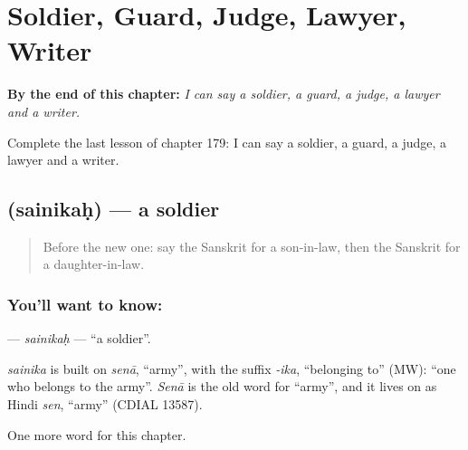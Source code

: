 
\chapter{Soldier, Guard, Judge, Lawyer, Writer}
\label{ch:sa-soldier-guard-judge-lawyer-writer}

\begin{chapteropening}
\textbf{By the end of this chapter:} \emph{I can say a soldier, a guard, a judge, a lawyer and a writer.}

Complete the last lesson of chapter 179: I can say a soldier, a guard, a judge, a lawyer and a writer.
\end{chapteropening}

\section[\texorpdfstring{\sk{सैनिकः} (sainikaḥ)}{सैनिकः (sainikaḥ)}]{ (sainikaḥ) — a soldier}

\label{lesson:SA-C179-sainikah}



\begin{quote}
Before the new one: say the Sanskrit for a son-in-law, then the Sanskrit for a daughter-in-law.
\end{quote}

\subsection*{You'll want to know: }
\textbf{} — \emph{sainikaḥ} — \textquotedblleft{}a soldier\textquotedblright{}.

\begin{cousinweb}
\emph{sainika} is built on \emph{senā}, \textquotedblleft{}army\textquotedblright{}, with the suffix \emph{-ika}, \textquotedblleft{}belonging to\textquotedblright{} (MW): \textquotedblleft{}one who belongs to the army\textquotedblright{}. \emph{Senā} is the old word for \textquotedblleft{}army\textquotedblright{}, and it lives on as Hindi \emph{sen}, \textquotedblleft{}army\textquotedblright{} (CDIAL 13587).
\end{cousinweb}

\begin{grammarlens}[title={What you've built}]
One more word for this chapter.
\end{grammarlens}

